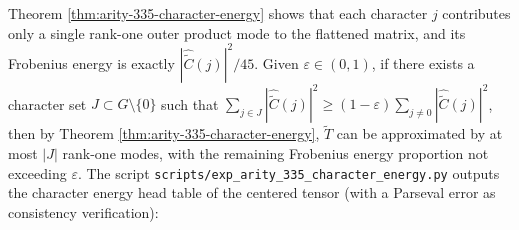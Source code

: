 \begin{remark}[Auditable diagnostic: character energy head proportion \texorpdfstring{$\Rightarrow$}{=>} low-rank compressibility]\label{rem:arity-335-character-energy-diagnostic}
Theorem \ref{thm:arity-335-character-energy} shows that each character \(j\) contributes only a single rank-one outer product mode to the flattened matrix, and its Frobenius energy is exactly \(|\widehat{\widetilde C}(j)|^2/45\).
Given \(\varepsilon\in(0,1)\), if there exists a character set \(J\subset G\setminus\{0\}\) such that \(\sum_{j\in J}|\widehat{\widetilde C}(j)|^2\ge (1-\varepsilon)\sum_{j\ne 0}|\widehat{\widetilde C}(j)|^2\), then by Theorem \ref{thm:arity-335-character-energy}, \(\widetilde T\) can be approximated by at most \(|J|\) rank-one modes, with the remaining Frobenius energy proportion not exceeding \(\varepsilon\).
The script \texttt{scripts/exp\_arity\_335\_character\_energy.py} outputs the character energy head table of the centered tensor (with a Parseval error as consistency verification):

\end{remark}

